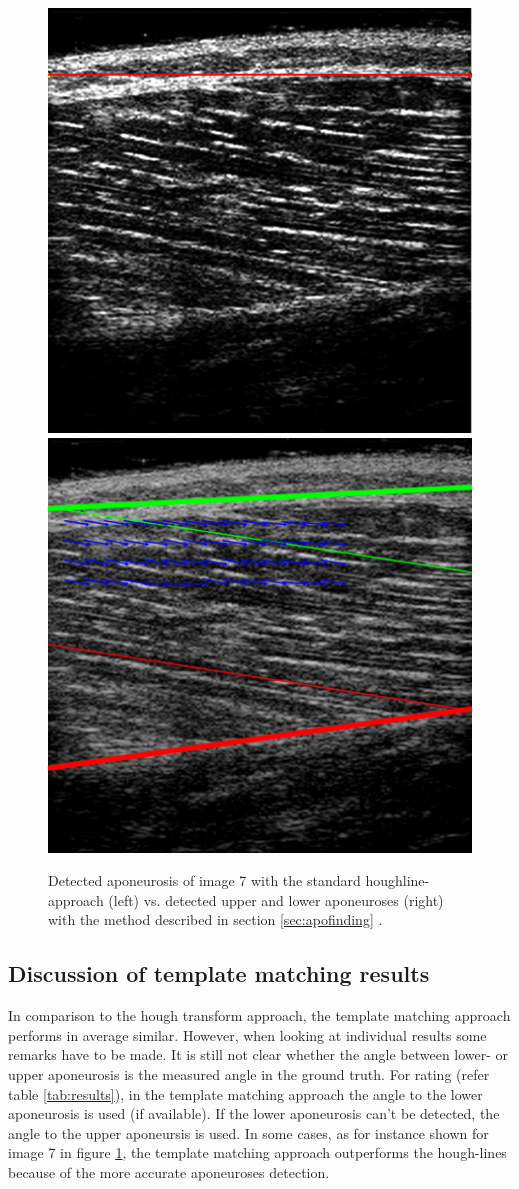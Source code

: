 \documentclass[10pt,twocolumn,letterpaper]{article}
\begin{document}
\begin{figure}
	\begin{center}		
		\includegraphics[width=0.45\linewidth]{img/im7_hough_apo}
		\includegraphics[width=0.45\linewidth]{img/im7_apo_ela}
	\end{center}
	\caption{Detected aponeurosis of image 7 with the standard houghline-approach (left) vs. detected upper and lower aponeuroses (right) with the method described in section \ref{sec:apofinding}  .}
	\label{fig:im7_hough_apo}
	
\end{figure}

\subsection{Discussion of template matching results}
In comparison to the hough transform approach, the template matching approach performs in average similar. However, when looking at individual results some remarks have to be made. It is still not clear whether the angle between lower- or upper aponeurosis is the measured angle in the ground truth. For rating (refer table \ref{tab:results}), in the template matching approach the angle to the lower aponeurosis is used (if available). If the lower aponeurosis can't be detected, the angle to the upper aponeursis is used. In some cases, as for instance shown for image 7 in figure \ref{fig:im7_hough_apo}, the template matching approach outperforms the hough-lines because of the more accurate aponeuroses detection. 
\end{document}
